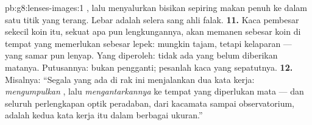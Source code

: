 \begin{solution}{pb:g8:lenses-images:1}
, lalu menyalurkan bisikan sepiring makan penuh ke dalam
satu titik yang terang. Lebar adalah selera sang ahli falak.
\textbf{11.} Kaca pembesar sekecil koin itu, sekuat apa pun
lengkungannya, akan memanen   sebesar koin di tempat yang
memerlukan sebesar lepek:  mungkin tajam, tetapi kelaparan
---  yang samar pun lenyap. Yang diperoleh: tidak ada yang
belum diberikan  matanya. Putusannya: bukan pengganti; pesanlah
kaca yang sepatutnya.
\textbf{12.} Misalnya: ``Segala yang ada di rak ini menjalankan dua
kata kerja: \emph{mengumpulkan} , lalu \emph{mengantarkannya} ke
tempat yang diperlukan mata --- dan seluruh perlengkapan optik
peradaban, dari kacamata sampai observatorium, adalah kedua kata kerja
itu dalam berbagai ukuran.''
\end{solution}

